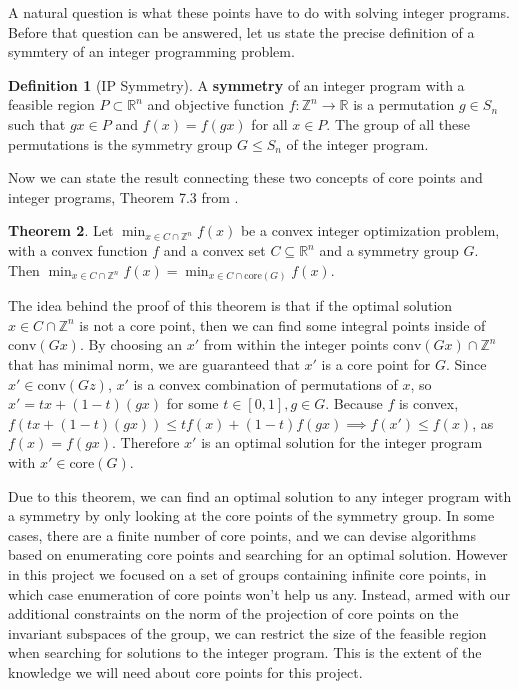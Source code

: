 \documentclass[11pt]{article} %
\theoremstyle{definition}
\newtheorem{theorem}{Theorem}[section]
\newtheorem{definition}[theorem]{Definition}
\theoremstyle{remark}
\newcommand{\ZZ}{\mathbb{Z}}
\newcommand{\RR}{\mathbb{R}}
\begin{document}
A natural question is what these points have to do with solving integer programs. Before that question can be answered, let us state the precise definition of a symmtery of an integer programming problem. 

\begin{definition}[IP Symmetry]
A \textbf{symmetry} of an integer program with a feasible region $P \subset \RR^n$ and objective function $f : \ZZ^n \rightarrow \RR$ is a permutation $g \in S_n$ such that $gx \in P$ and $f(x) = f(gx)$ for all $x \in P$. The group of all these permutations is the symmetry group $G \leq S_n$ of the integer program.
\end{definition}

Now we can state the result connecting these two concepts of core points and integer programs, Theorem 7.3 from \cite{rehn}.

\begin{theorem} \label{cpclose}
Let $\min_{x \in C \cap \ZZ^n} f(x)$ be a convex integer optimization problem, with a convex function $f$ and a convex set $C \subseteq \mathbb{R}^n$ and a symmetry group $G$. Then $\min_{x \in C \cap \ZZ^n} f(x) = \min_{x \in C \cap \textrm{core}(G)} f(x)$.
\end{theorem}

The idea behind the proof of this theorem is that if the optimal solution $x \in C \cap \ZZ^n$ is not a core point, then we can find some integral points inside of $\textrm{conv}(Gx)$. By choosing an $x'$ from within the integer points $\textrm{conv}(Gx) \cap \ZZ^n$ that has minimal norm, we are guaranteed that $x'$ is a core point for $G$. Since $x' \in \textrm{conv}(Gz)$, $x'$ is a convex combination of permutations of $x$, so $x' = tx + (1-t)(gx)$ for some $t \in [0,1], g \in G$. Because $f$ is convex, $f(tx + (1-t)(gx)) \leq tf(x) + (1-t)f(gx) \implies f(x') \leq f(x)$, as $f(x) = f(gx)$. Therefore $x'$ is an optimal solution for the integer program with $x' \in \textrm{core}(G)$.

Due to this theorem, we can find an optimal solution to any integer program with a symmetry by only looking at the core points of the symmetry group. In some cases, there are a finite number of core points, and we can devise algorithms based on enumerating core points and searching for an optimal solution. However in this project we focused on a set of groups containing infinite core points, in which case enumeration of core points won't help us any. Instead, armed with our additional constraints on the norm of the projection of core points on the invariant subspaces of the group, we can restrict the size of the feasible region when searching for solutions to the integer program. This is the extent of the knowledge we will need about core points for this project.
\end{document}
